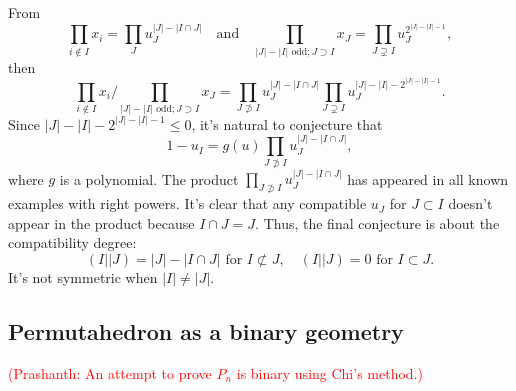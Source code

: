 \documentclass[hidelinks,12pt]{article}
\begin{document}
From
\[
\prod_{i\not\in I}x_i=\prod_J u_J^{|J|-|I\cap J|}
\quad\text{and}\quad
\prod_{|J|-|I| \text{ odd}; J\supset I}x_J
=
\prod_{J\supsetneq I}u_J^{2^{|J|-|I|-1}},
\]
then
\[
\prod_{i\not\in I}x_i\bigg/\prod_{|J|-|I| \text{ odd}; J\supset I}x_J
=\prod_{J\not\supset I} u_J^{|J|-|I\cap J|}\prod_{J\supsetneq I} u_J^{|J|-|I|-2^{|J|-|I|-1}}.
\]
Since $|J|-|I|-2^{|J|-|I|-1}\leq 0$, it's natural to conjecture that
\begin{equation}
1-u_I=g(u)\prod_{J\not\supset I} u_J^{|J|-|I\cap J|},
\end{equation}
where $g$ is a polynomial.
The product $\prod_{J\not\supset I} u_J^{|J|-|I\cap J|}$ has appeared in all known examples with right powers. It's clear that any compatible $u_J$ for $J\subset I$ doesn't appear in the product because $I\cap J=J$. Thus, the final conjecture is about the compatibility degree:
\[
(I||J)=|J|-|I\cap J|\text{ for $I\not\subset J$},\quad  (I||J)=0 \text{ for $I\subset J$}.
\]
It's not symmetric when $|I|\neq |J|$.


\subsection{Permutahedron as a binary geometry}

\textcolor{red}{(Prashanth: An attempt to prove $P_n$ is binary using Chi's method.)}
\end{document}
